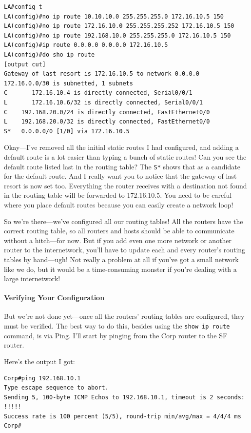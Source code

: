\begin{verbatim}
LA#config t
LA(config)#no ip route 10.10.10.0 255.255.255.0 172.16.10.5 150
LA(config)#no ip route 172.16.10.0 255.255.255.252 172.16.10.5 150
LA(config)#no ip route 192.168.10.0 255.255.255.0 172.16.10.5 150
LA(config)#ip route 0.0.0.0 0.0.0.0 172.16.10.5
LA(config)#do sho ip route
[output cut]
Gateway of last resort is 172.16.10.5 to network 0.0.0.0
172.16.0.0/30 is subnetted, 1 subnets
C       172.16.10.4 is directly connected, Serial0/0/1
L       172.16.10.6/32 is directly connected, Serial0/0/1
C    192.168.20.0/24 is directly connected, FastEthernet0/0
L    192.168.20.0/32 is directly connected, FastEthernet0/0
S*   0.0.0.0/0 [1/0] via 172.16.10.5
\end{verbatim}

Okay---I've removed all the initial static routes I had configured, and
adding a default route is a lot easier than typing a bunch of static
routes! Can you see the default route listed last in the routing table?
The \texttt{S*} shows that as a candidate for the default route. And I
really want you to notice that the gateway of last resort is now set
too. Everything the router receives with a destination not found in the
routing table will be forwarded to 172.16.10.5. You need to be careful
where you place default routes because you can easily create a network
loop!

So we're there---we've configured all our routing tables! All the
routers have the correct routing table, so all routers and hosts should
be able to communicate without a hitch---for now. But if you add even
one more network or another router to the internetwork, you'll have to
update each and every router's routing tables by hand---ugh! Not really
a problem at all if you've got a small network like we do, but it would
be a time-consuming monster if you're dealing with a large internetwork!

\paragraph{Verifying Your Configuration}

But we're not done yet---once all the routers' routing tables are
configured, they must be verified. The best way to do this, besides
using the \texttt{show\ ip\ route} command, is via Ping. I'll start by
pinging from the Corp router to the SF router.

Here's the output I got:

\begin{verbatim}
Corp#ping 192.168.10.1
Type escape sequence to abort.
Sending 5, 100-byte ICMP Echos to 192.168.10.1, timeout is 2 seconds:
!!!!!
Success rate is 100 percent (5/5), round-trip min/avg/max = 4/4/4 ms
Corp#
\end{verbatim}

